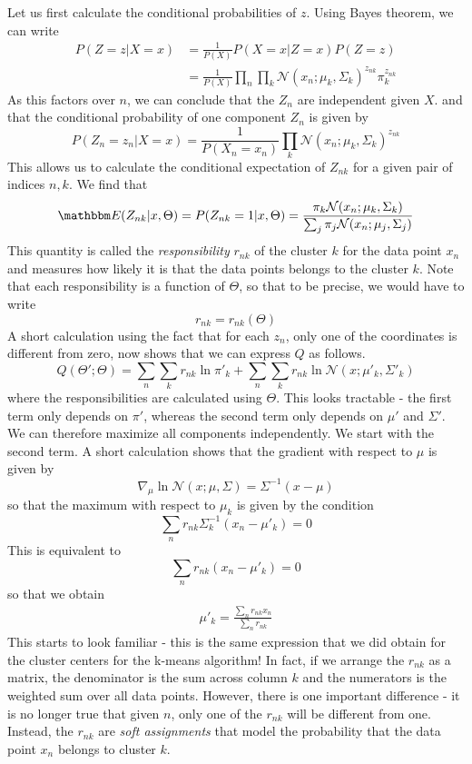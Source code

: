 \documentclass[a4paper, draft]{article}
\theoremstyle{own}
\theoremstyle{remark}
\begin{document}
Let us first calculate the conditional probabilities of $z$. Using Bayes theorem, we can write
\begin{align*}
P(Z = z | X = x) &= \frac{1}{P(X)} P(X=x | Z=x) P(Z = z)    \\
&= \frac{1}{P(X)} \prod_n \prod_k {\mathcal N}(x_n ; \mu_k, \Sigma_k)^{z_{nk}} \pi_k^{z_{nk}}
\end{align*}
As this factors over $n$, we can conclude that the $Z_n$ are independent given $X$. and that the conditional probability of one component $Z_n$ is given by
$$
P(Z_n = z_n | X = x) = \frac{1}{P(X_n = x_n)} \prod_k {\mathcal N}(x_n ; \mu_k, \Sigma_k)^{z_{nk}}
$$
This allows us to calculate the conditional expectation of $Z_{nk}$ for a given pair of indices $n,k$. We find that
\begin{align*}
{\mathbbm E}(Z_{nk} | x,\Theta ) = P(Z_{nk} = 1 | x, \Theta) = \frac{\pi_k {\mathcal N}(x_n ; \mu_k, \Sigma_k)}
{\sum_{j} \pi_j {\mathcal N}(x_n ; \mu_j, \Sigma_j) }
\end{align*}
This quantity is called the {\em responsibility} $r_{nk}$ of the cluster $k$ for the data point $x_n$ and measures how likely it is that the data points belongs to the cluster $k$. Note that each responsibility is a function of $\Theta$, so that to be precise, we would have to write
$$
r_{nk} = r_{nk}(\Theta)
$$
A short calculation using the fact that for each $z_n$, only one of the coordinates is different from zero, now shows that we can express $Q$ as follows.
$$
Q(\Theta'; \Theta) = \sum_n
\sum_k r_{nk} \ln \pi'_k 
+ \sum_n \sum_k r_{nk} \ln {\mathcal N}(x ; \mu'_k, \Sigma'_k)
$$
where the responsibilities are calculated using $\Theta$. This looks tractable - the first term  only depends on $\pi'$, whereas the second term only depends on $\mu'$ and $\Sigma'$. We can therefore maximize all components independently. We start with the second term. A short calculation shows that the gradient with respect to $\mu$ is given by
$$
\nabla_\mu \ln {\mathcal N}(x; \mu , \Sigma) = \Sigma^{-1}(x-\mu)
$$
so that the maximum with respect to $\mu_k$ is given by the condition
$$
\sum_n r_{nk} \Sigma_k^{-1} (x_n - \mu'_k) = 0
$$
This is equivalent to
$$
\sum_n r_{nk} (x_n - \mu'_k) = 0
$$
so that we obtain 
\begin{align}\label{eq:maxlikelihoodmixturecentres}
\mu'_k = \frac{\sum_n r_{nk} x_n}{\sum_n r_{nk}}
\end{align}
This starts to look familiar - this is the same expression that we did obtain for the cluster centers for the k-means algorithm! In fact, if we arrange the $r_{nk}$ as a matrix, the denominator is the sum across column $k$ and the numerators is the weighted sum over all data points. However, there is one important difference - it is no longer true that given $n$, only one of the $r_{nk}$ will be different from one. Instead, the $r_{nk}$ are {\em soft assignments} that model the probability that the data point $x_n$ belongs to cluster $k$. 
\end{document}
